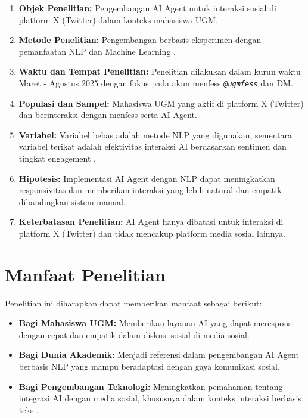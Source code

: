 \noindent
	\parbox{\textwidth}{
		\begin{enumerate}
			\item \textbf{Objek Penelitian:} Pengembangan AI Agent untuk interaksi sosial di platform X (Twitter) dalam konteks mahasiswa UGM.
			\item \textbf{Metode Penelitian:} Pengembangan berbasis eksperimen dengan pemanfaatan NLP dan Machine Learning \cite{ghosh2025voice}.
			\item \textbf{Waktu dan Tempat Penelitian:} Penelitian dilakukan dalam kurun waktu Maret - Agustus 2025 dengan fokus pada akun menfess \textit{\texttt{@ugmfess}} dan DM.
			\item \textbf{Populasi dan Sampel:} Mahasiswa UGM yang aktif di platform X (Twitter) dan berinteraksi dengan menfess serta AI Agent.
			\item \textbf{Variabel:} Variabel bebas adalah metode NLP yang digunakan, sementara variabel terikat adalah efektivitas interaksi AI berdasarkan sentimen dan tingkat engagement \cite{han2025chatbots}.
			\item \textbf{Hipotesis:} Implementasi AI Agent dengan NLP dapat meningkatkan responsivitas dan memberikan interaksi yang lebih natural dan empatik dibandingkan sistem manual.
			\item \textbf{Keterbatasan Penelitian:} AI Agent hanya dibatasi untuk interaksi di platform X (Twitter) dan tidak mencakup platform media sosial lainnya.
		\end{enumerate}
	}

\section{Manfaat Penelitian}

Penelitian ini diharapkan dapat memberikan manfaat sebagai berikut:

\begin{itemize}
	\item \textbf{Bagi Mahasiswa UGM:} Memberikan layanan AI yang dapat merespons dengan cepat dan empatik dalam diskusi sosial di media sosial.
	\item \textbf{Bagi Dunia Akademik:} Menjadi referensi dalam pengembangan AI Agent berbasis NLP yang mampu beradaptasi dengan gaya komunikasi sosial.
	\item \textbf{Bagi Pengembangan Teknologi:} Meningkatkan pemahaman tentang integrasi AI dengan media sosial, khususnya dalam konteks interaksi berbasis teks \cite{alathamneh2024t5}.
\end{itemize}
